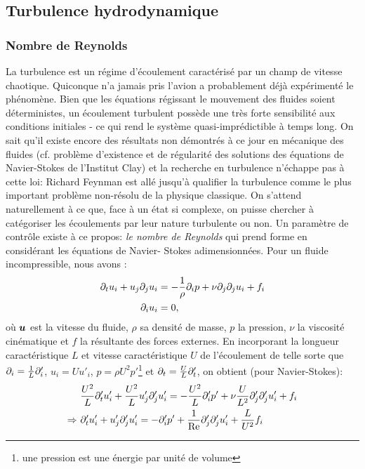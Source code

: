 \documentclass[13pt, a4paper]{extarticle}
\begin{document}
\subsection{Turbulence hydrodynamique}

\subsubsection{Nombre de Reynolds}

\noindent La turbulence est un régime d'écoulement caractérisé par un champ de vitesse chaotique.
Quiconque n'a jamais pris l'avion a probablement déjà expérimenté le phénomène. Bien que les 
équations régissant le mouvement des ﬂuides soient déterministes, un écoulement turbulent possède
une très forte sensibilité aux conditions initiales - ce qui rend le système quasi-imprédictible à
temps long. On sait qu'il existe encore des résultats non démontrés à ce jour en mécanique 
des fluides (cf. problème d'existence et de régularité des solutions des équations de Navier-Stokes
de l'Institut Clay) et la recherche en turbulence n'échappe pas à cette loi: Richard Feynman est 
allé jusqu'à qualifier la turbulence comme le plus important problème non-résolu de la physique 
classique. On s'attend naturellement à ce que, face à un état si complexe, on puisse chercher à 
catégoriser les écoulements par leur nature turbulente ou non. Un paramètre de contrôle existe à 
ce propos: \emph{le nombre de Reynolds} qui prend forme en considérant les équations de Navier-
Stokes adimensionnées. Pour un fluide incompressible, nous avons :
\begin{align}
    \partial_t u_i + u_j\partial_ju_i &= -\dfrac{1}{\rho}\partial_i p + \nu\partial_j\partial_ju_i + f_i\label{eq:NS}\\
    \partial_i u_i &= 0,
\end{align}
où $\boldsymbol{u}$ est la vitesse du fluide, $\rho$ sa densité de masse, $p$ la pression, $\nu$ la 
viscosité cinématique et $f$ la résultante des forces externes. En incorporant la longueur 
caractéristique $L$ et vitesse caractéristique $U$ de l'écoulement de telle sorte que 
$\partial_i= \frac{1}{L}\partial'_i$, $u_i=Uu'_i$, $p=\rho U^2p'$\footnote{une pression est une énergie par unité de volume} 
et $\partial_t = \frac{U}{L}\partial'_t$, on obtient (pour Navier-Stokes):
\begin{align}
     &\frac{U^2}{L}\partial'_t u'_i + \frac{U^2}{L}u'_j\partial'_ju'_i = -\frac{U^2}{L}\partial'_ip' + 
     \nu \frac{U}{L^2}\partial'_j\partial'_ju'_i + f_i \\
     \Rightarrow~&\partial'_t u'_i + u'_j\partial'_ju'_i = -\partial'_i p' + \dfrac{1}{\text{Re}}\partial'_j\partial'_ju'_i 
     + \frac{L}{U^2}f_i
\end{align}
\end{document}
